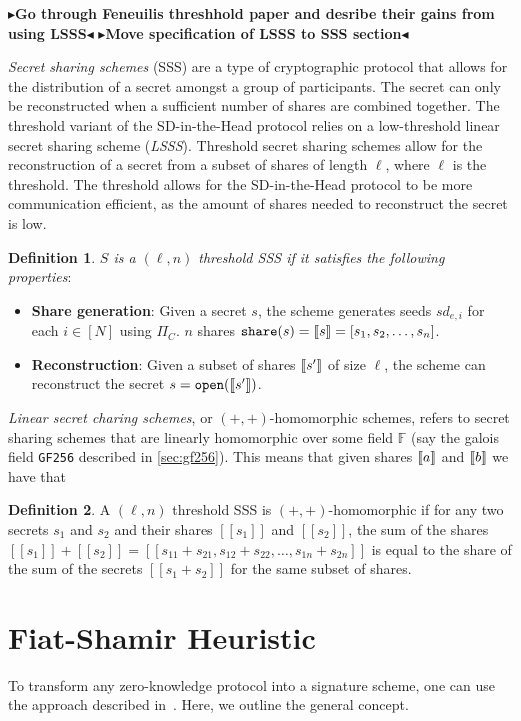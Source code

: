 \documentclass[twoside,11pt]{report}
\theoremstyle{definition}
\newtheorem{definition}{Definition}[section]
\theoremstyle{plain}
\newcommand{\todo}[1]{{\color[rgb]{.5,0,0}\textbf{$\blacktriangleright$#1$\blacktriangleleft$}}}
\begin{document}
\todo{Go through Feneuilis threshhold paper and desribe their gains from using LSSS}
\todo{Move specification of LSSS to SSS section}

\textit{Secret sharing schemes} (SSS) are a type of cryptographic protocol that allows for the distribution of a secret amongst a group of participants. The secret can only be reconstructed when a sufficient number of shares are combined together. The threshold variant of the SD-in-the-Head protocol relies on a low-threshold linear secret sharing scheme (\textit{LSSS}). Threshold secret sharing schemes allow for the reconstruction of a secret from a subset of shares of length $\ell$, where $\ell$ is the threshold. The threshold allows for the SD-in-the-Head protocol to be more communication efficient, as the amount of shares needed to reconstruct the secret is low.

\begin{definition}\label{def:sss}
  \textit{$S$ is a $(\ell,n)$ threshold SSS if it satisfies the following properties}:

  \begin{itemize}
    \item \textbf{Share generation}: Given a secret $s$, the scheme generates seeds $sd_{e,i}$ for each $i \in [N]$ using $\Pi_C$. $n$ shares $\texttt{share}(s) = \llbracket s \rrbracket = [s_1, s_2, \dots, s_n]$.
    \item \textbf{Reconstruction}: Given a subset of shares $\llbracket s' \rrbracket$ of size $\ell$, the scheme can reconstruct the secret $s = \texttt{open}(\llbracket s' \rrbracket)$.
  \end{itemize}

\end{definition}

\textit{Linear secret charing schemes}, or $(+,+)$-homomorphic schemes, refers to secret sharing schemes that are linearly homomorphic over some field $\mathbb{F}$ (say the galois field \texttt{GF256} described in \autoref{sec:gf256}). This means that given shares $\llbracket a \rrbracket$ and $\llbracket b \rrbracket$ we have that
\begin{definition}
  A $(\ell,n)$ threshold SSS is $(+,+)$-homomorphic if for any two secrets $s_1$ and $s_2$ and their shares $[[s_1]]$ and $[[s_2]]$, the sum of the shares $[[s_1]] + [[s_2]] = [[s_{11} + s_{21}, s_{12} + s_{22}, \dots, s_{1n} + s_{2n}]]$ is equal to the share of the sum of the secrets $[[s_1 + s_2]]$ for the same subset of shares.
\end{definition}

\section{Fiat-Shamir Heuristic}\label{sec:fiatshamir}
To transform any zero-knowledge protocol into a signature scheme, one can use the approach described in~\cite{fiat1986prove}. Here, we outline the general concept.
\end{document}
